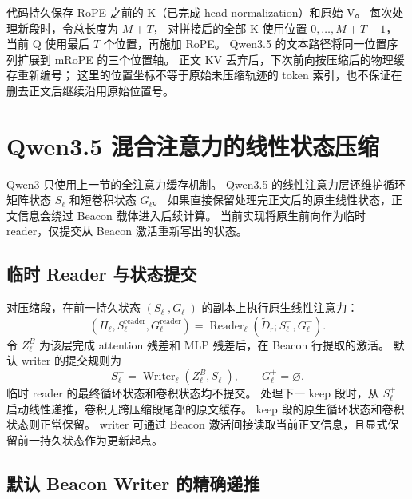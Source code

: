 \documentclass[UTF8,a4paper,11pt]{ctexart}
\begin{document}
代码持久保存 RoPE 之前的 K（已完成 head normalization）和原始 V。
每次处理新段时，令总长度为 $M+T$，
对拼接后的全部 K 使用位置 $0,\ldots,M+T-1$，
当前 Q 使用最后 $T$ 个位置，再施加 RoPE。
Qwen3.5 的文本路径将同一位置序列扩展到 mRoPE 的三个位置轴。
正文 KV 丢弃后，下次前向按压缩后的物理缓存重新编号；
这里的位置坐标不等于原始未压缩轨迹的 token 索引，也不保证在删去正文后继续沿用原始位置号。

\section{Qwen3.5 混合注意力的线性状态压缩}

Qwen3 只使用上一节的全注意力缓存机制。
Qwen3.5 的线性注意力层还维护循环矩阵状态 $S_\ell$ 和短卷积状态 $G_\ell$。
如果直接保留处理完正文后的原生线性状态，正文信息会绕过 Beacon 载体进入后续计算。
当前实现将原生前向作为临时 reader，仅提交从 Beacon 激活重新写出的状态。

\subsection{临时 Reader 与状态提交}

对压缩段，在前一持久状态 $(S_\ell^-,G_\ell^-)$ 的副本上执行原生线性注意力：
\begin{equation}
(H_\ell,S_\ell^{\mathrm{reader}},G_\ell^{\mathrm{reader}})
=\operatorname{Reader}_\ell(\widetilde D_r;S_\ell^-,G_\ell^-).
\end{equation}
令 $Z_\ell^B$ 为该层完成 attention 残差和 MLP 残差后，在 Beacon 行提取的激活。
默认 writer 的提交规则为
\begin{equation}\label{eq:writer-commit}
\boxed{
S_\ell^+=\operatorname{Writer}_\ell(Z_\ell^B,S_\ell^-),
\qquad G_\ell^+=\varnothing.
}
\end{equation}
临时 reader 的最终循环状态和卷积状态均不提交。
处理下一 keep 段时，从 $S_\ell^+$ 启动线性递推，卷积无跨压缩段尾部的原文缓存。
keep 段的原生循环状态和卷积状态则正常保留。
writer 可通过 Beacon 激活间接读取当前正文信息，且显式保留前一持久状态作为更新起点。

\subsection{默认 Beacon Writer 的精确递推}
\end{document}
